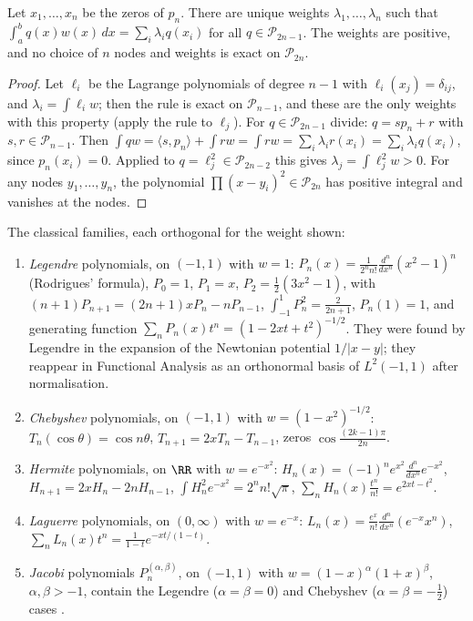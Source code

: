 \begin{theorem}\label{special-functions:theorem-gauss-quadrature}
Let $x_1, \ldots, x_n$ be the zeros of $p_n$. There are unique weights $\lambda_1, \ldots, \lambda_n$ such that $\int_a^bq(x)w(x)\,dx = \sum_i\lambda_iq(x_i)$ for all $q \in \mathcal{P}_{2n-1}$. The weights are positive, and
no choice of $n$ nodes and weights is exact on $\mathcal{P}_{2n}$.
\end{theorem}

\begin{proof}
Let $\ell_i$ be the Lagrange polynomials of degree $n - 1$ with $\ell_i(x_j) = \delta_{ij}$, and $\lambda_i = \int\ell_iw$; then the rule is exact on $\mathcal{P}_{n-1}$, and these are the only weights with this property (apply the
rule to $\ell_j$). For $q \in \mathcal{P}_{2n-1}$ divide: $q = sp_n + r$ with $s, r \in \mathcal{P}_{n-1}$. Then $\int qw = \langle s, p_n\rangle + \int rw = \int rw = \sum_i\lambda_ir(x_i) = \sum_i\lambda_iq(x_i)$, since
$p_n(x_i) = 0$. Applied to $q = \ell_j^2 \in \mathcal{P}_{2n-2}$ this gives $\lambda_j = \int\ell_j^2w > 0$. For any nodes $y_1, \ldots, y_n$, the polynomial $\prod(x - y_i)^2 \in \mathcal{P}_{2n}$ has positive integral and vanishes at
the nodes.
\end{proof}

\begin{example}\label{special-functions:example-classical-polynomials}
The classical families, each orthogonal for the weight shown:
\begin{enumerate}
\item \emph{Legendre} polynomials, on $(-1, 1)$ with $w = 1$: $P_n(x) = \frac{1}{2^nn!}\frac{d^n}{dx^n}(x^2 - 1)^n$ (Rodrigues' formula), $P_0 = 1$, $P_1 = x$, $P_2 = \frac12(3x^2 - 1)$, with
$(n + 1)P_{n+1} = (2n + 1)xP_n - nP_{n-1}$, $\int_{-1}^1P_n^2 = \frac{2}{2n + 1}$, $P_n(1) = 1$, and generating function $\sum_nP_n(x)t^n = (1 - 2xt + t^2)^{-1/2}$. They were found by Legendre in the expansion of the
Newtonian potential $1/|x - y|$; they reappear in Functional Analysis as an orthonormal basis of $L^2(-1, 1)$ after normalisation.
\item \emph{Chebyshev} polynomials, on $(-1, 1)$ with $w = (1 - x^2)^{-1/2}$: $T_n(\cos\theta) = \cos n\theta$, $T_{n+1} = 2xT_n - T_{n-1}$, zeros $\cos\frac{(2k - 1)\pi}{2n}$.
\item \emph{Hermite} polynomials, on $\RR$ with $w = e^{-x^2}$: $H_n(x) = (-1)^ne^{x^2}\frac{d^n}{dx^n}e^{-x^2}$, $H_{n+1} = 2xH_n - 2nH_{n-1}$, $\int H_n^2e^{-x^2} = 2^nn!\sqrt{\pi}$, $\sum_nH_n(x)\frac{t^n}{n!} = e^{2xt - t^2}$.
\item \emph{Laguerre} polynomials, on $(0, \infty)$ with $w = e^{-x}$: $L_n(x) = \frac{e^x}{n!}\frac{d^n}{dx^n}(e^{-x}x^n)$, $\sum_nL_n(x)t^n = \frac{1}{1 - t}e^{-xt/(1-t)}$.
\item \emph{Jacobi} polynomials $P_n^{(\alpha, \beta)}$, on $(-1, 1)$ with $w = (1 - x)^\alpha(1 + x)^\beta$, $\alpha, \beta > -1$, contain the Legendre ($\alpha = \beta = 0$) and Chebyshev ($\alpha = \beta = -\frac12$) cases \cite{szego-orthogonal}.
\end{enumerate}
\end{example}

